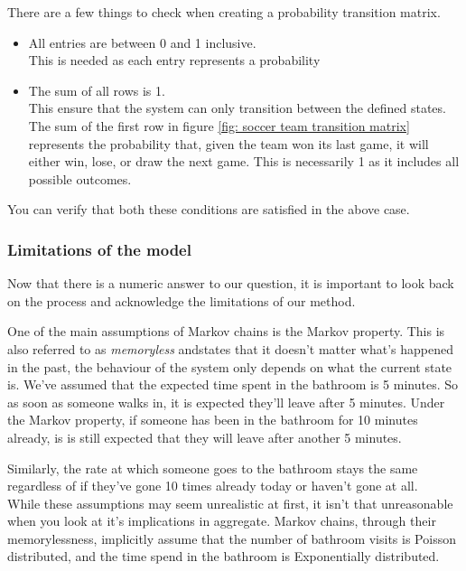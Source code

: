 There are a few things to check when creating a probability transition matrix.
\begin{itemize}
	\item All entries are between 0 and 1 inclusive.\\
	This is needed as each entry represents a probability
	\item The sum of all rows is 1.\\
	This ensure that the system can only transition between the defined states. The sum of the first row in figure \ref{fig: soccer team transition matrix} represents the probability that, given the team won its last game, it will either win, lose, or draw the next game. This is necessarily 1 as it includes all possible outcomes.
\end{itemize}
You can verify that both these conditions are satisfied in the above case.

\subsubsection*{Limitations of the model}
Now that there is a numeric answer to our question, it is important to look back on the process and acknowledge the limitations of our method.

One of the main assumptions of Markov chains is the Markov property. This is also referred to as \textit{memoryless} andstates that it doesn't matter what's happened in the past, the behaviour of the system only depends on what the current state is. We've assumed that the expected time spent in the bathroom is 5 minutes. So as soon as someone walks in, it is expected they'll leave after 5 minutes. Under the Markov property, if someone has been in the bathroom for 10 minutes already, is is still expected that they will leave after another 5 minutes.

Similarly, the rate at which someone goes to the bathroom stays the same regardless of if they've gone 10 times already today or haven't gone at all.
\\

While these assumptions may seem unrealistic at first, it isn't that unreasonable when you look at it's implications in aggregate. Markov chains, through their memorylessness, implicitly assume that the number of bathroom visits is Poisson distributed, and the time spend in the bathroom is Exponentially distributed. 